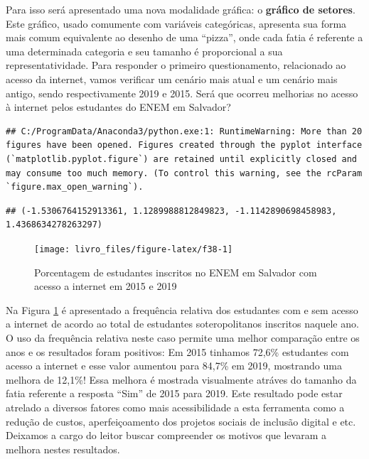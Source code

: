 \documentclass[
  oneside]{book}
\begin{document}
Para isso será apresentado uma nova modalidade gráfica: o \textbf{gráfico de setores}. Este gráfico, usado comumente com variáveis categóricas, apresenta sua forma mais comum equivalente ao desenho de uma ``pizza'', onde cada fatia é referente a uma determinada categoria e seu tamanho é proporcional a sua representatividade. Para responder o primeiro questionamento, relacionado ao acesso da internet, vamos verificar um cenário mais atual e um cenário mais antigo, sendo respectivamente 2019 e 2015. Será que ocorreu melhorias no acesso à internet pelos estudantes do ENEM em Salvador?

\begin{verbatim}
## C:/ProgramData/Anaconda3/python.exe:1: RuntimeWarning: More than 20 figures have been opened. Figures created through the pyplot interface (`matplotlib.pyplot.figure`) are retained until explicitly closed and may consume too much memory. (To control this warning, see the rcParam `figure.max_open_warning`).
\end{verbatim}

\begin{verbatim}
## (-1.5306764152913361, 1.1289988812849823, -1.1142890698458983, 1.4368634278263297)
\end{verbatim}

\begin{figure}

{\centering \texttt{[image: livro\_files/figure-latex/f38-1]} 

}

\caption{Porcentagem de estudantes inscritos no ENEM em Salvador com acesso a internet em 2015 e 2019}\label{fig:f38}
\end{figure}

Na Figura \ref{fig:f38} é apresentado a frequência relativa dos estudantes com e sem acesso a internet de acordo ao total de estudantes soteropolitanos inscritos naquele ano. O uso da frequência relativa neste caso permite uma melhor comparação entre os anos e os resultados foram positivos: Em 2015 tinhamos 72,6\% estudantes com acesso a internet e esse valor aumentou para 84,7\% em 2019, mostrando uma melhora de 12,1\%! Essa melhora é mostrada visualmente atráves do tamanho da fatia referente a resposta ``Sim'' de 2015 para 2019. Este resultado pode estar atrelado a diversos fatores como mais acessibilidade a esta ferramenta como a redução de custos, aperfeiçoamento dos projetos sociais de inclusão digital e etc. Deixamos a cargo do leitor buscar compreender os motivos que levaram a melhora nestes resultados.
\end{document}
